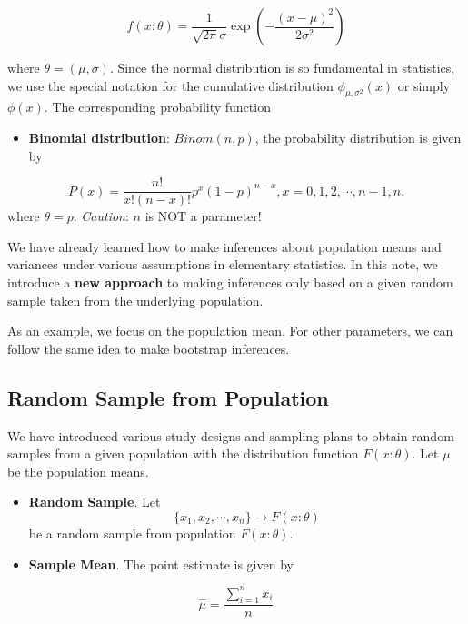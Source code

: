 \documentclass[
]{book}
\providecommand{\tightlist}{%
  \setlength{\itemsep}{0pt}\setlength{\parskip}{0pt}}
\begin{document}
\[
f(x:\theta) = \frac{1}{\sqrt{2\pi}\sigma}\exp\left(-\frac{(x-\mu)^2}{2\sigma^2}\right)
\]

where \(\theta = (\mu, \sigma)\). Since the normal distribution is so fundamental in statistics, we use the special notation for the cumulative distribution \(\phi_{\mu, \sigma^2}(x)\) or simply \(\phi(x)\). The corresponding probability function

\begin{itemize}
\tightlist
\item
  \textbf{Binomial distribution}: \(Binom(n, p)\), the probability distribution is given by
\end{itemize}

\[ 
P(x) = \frac{n!}{x!(n-x)!}p^x(1-p)^{n-x}, x = 0, 1, 2, \cdots, n-1, n.
\]
where \(\theta = p\). \emph{Caution}: \(n\) is NOT a parameter!

We have already learned how to make inferences about population means and variances under various assumptions in elementary statistics. In this note, we introduce a \textbf{new approach} to making inferences only based on a given random sample taken from the underlying population.

As an example, we focus on the population mean. For other parameters, we can follow the same idea to make bootstrap inferences.

\hypertarget{random-sample-from-population}{%
\subsection{Random Sample from Population}\label{random-sample-from-population}}

We have introduced various study designs and sampling plans to obtain random samples from a given population with the distribution function \(F(x:\theta)\). Let \(\mu\) be the population means.

\begin{itemize}
\item
  \textbf{Random Sample}. Let
  \[\{x_1, x_2, \cdots, x_n\} \to F(x:\theta)\]
  be a random sample from population \(F(x:\theta)\).
\item
  \textbf{Sample Mean}. The point estimate is given by
\end{itemize}

\[\hat{\mu} = \frac{\sum_{i=1}^n x_i}{n}\]
\end{document}
